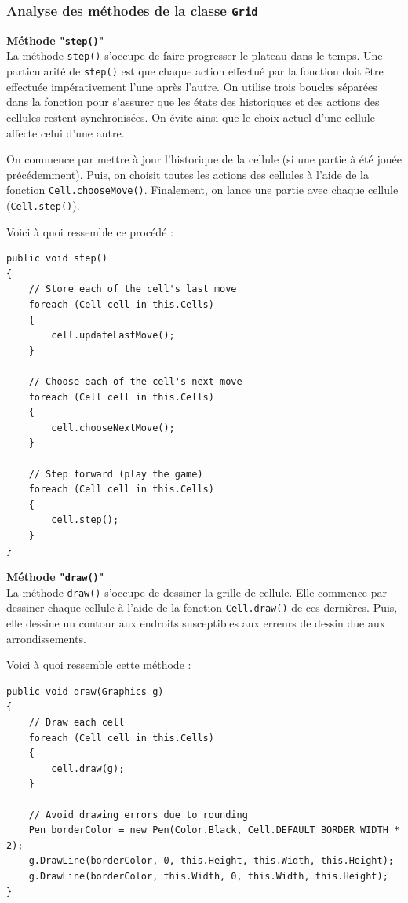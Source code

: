 \documentclass[a4paper]{article}
\begin{document}
\subsubsection{Analyse des méthodes de la classe \texttt{Grid}}
\textbf{Méthode "\texttt{step()}"}\\
La méthode \texttt{step()} s'occupe de faire progresser le plateau dans le temps. Une particularité de \texttt{step()} est que chaque action effectué par la fonction doit être effectuée impérativement l'une après l'autre. On utilise trois boucles séparées dans la fonction pour s'assurer que les états des historiques et des actions des cellules restent synchronisées. On évite ainsi que le choix actuel d'une cellule affecte celui d'une autre.

On commence par mettre à jour l'historique de la cellule (si une partie à été jouée précédemment). Puis, on choisit toutes les actions des cellules à l'aide de la fonction \texttt{Cell.chooseMove()}. Finalement, on lance une partie avec chaque cellule (\texttt{Cell.step()}).

Voici à quoi ressemble ce procédé :
\begin{lstlisting}
public void step()
{
    // Store each of the cell's last move
    foreach (Cell cell in this.Cells)
    {
        cell.updateLastMove();
    }

    // Choose each of the cell's next move
    foreach (Cell cell in this.Cells)
    {
        cell.chooseNextMove();
    }

    // Step forward (play the game)
    foreach (Cell cell in this.Cells)
    {
        cell.step();
    }
}
\end{lstlisting}

\textbf{Méthode "\texttt{draw()}"}\\
La méthode \texttt{draw()} s'occupe de dessiner la grille de cellule. Elle commence par dessiner chaque cellule à l'aide de la fonction \texttt{Cell.draw()} de ces dernières. Puis, elle dessine un contour aux endroits susceptibles aux erreurs de dessin due aux arrondissements.

Voici à quoi ressemble cette méthode :
\begin{lstlisting}
public void draw(Graphics g)
{
    // Draw each cell
    foreach (Cell cell in this.Cells)
    {
        cell.draw(g);
    }

    // Avoid drawing errors due to rounding
    Pen borderColor = new Pen(Color.Black, Cell.DEFAULT_BORDER_WIDTH * 2);
    g.DrawLine(borderColor, 0, this.Height, this.Width, this.Height);
    g.DrawLine(borderColor, this.Width, 0, this.Width, this.Height);
}
\end{lstlisting}
\pagebreak
\end{document}
